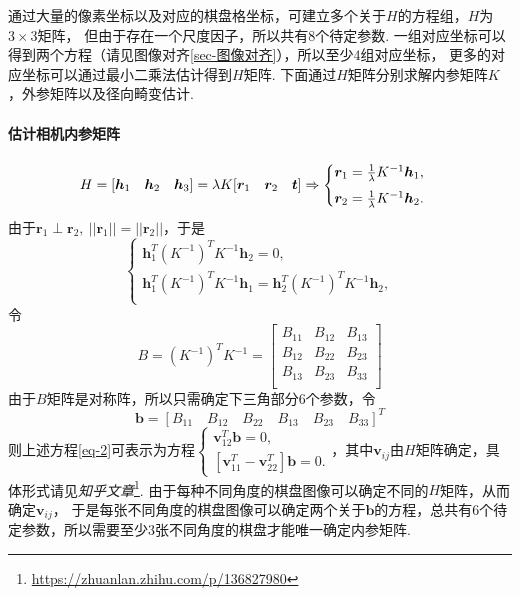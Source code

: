 \documentclass[12pt, a4paper, oneside]{ctexart}
\numberwithin{equation}{section}  %
\theoremstyle{definition}
\def\bd{\boldsymbol}        %
\def\add{\vspace{1ex}}      %
\def\del{\vspace{-1.5ex}}   %
\begin{document}
通过大量的像素坐标以及对应的棋盘格坐标，可建立多个关于$H$的方程组，$H$为$3\times 3$矩阵，
但由于存在一个尺度因子，所以共有$8$个待定参数. 一组对应坐标可以得到两个方程（请见图像对齐\ref{sec-图像对齐}），所以至少$4$组对应坐标，
更多的对应坐标可以通过最小二乘法估计得到$H$矩阵. 下面通过$H$矩阵分别求解内参矩阵$K$，外参矩阵以及径向畸变估计.

\paragraph{估计相机内参矩阵}\del
\begin{equation}
    \label{eq-1}
    H = [\bd{h}_1\quad \bd{h}_2\quad \bd{h}_3] = \lambda K[\bd{r}_1\quad \bd{r}_2\quad \bd{t}]\Rightarrow\begin{cases}
        \bd{r}_1 = \frac{1}{\lambda}K^{-1}\bd{h}_1,\add\\
        \bd{r}_2 = \frac{1}{\lambda}K^{-1}\bd{h}_2.
    \end{cases}
\end{equation}
由于$\bd{r}_1\perp \bd{r}_2,\ ||\bd{r}_1||=||\bd{r}_2||$，于是
\begin{equation}
    \label{eq-2}
    \begin{cases}
        \bd{h}_1^T(K^{-1})^TK^{-1}\bd{h}_2 = 0,\\
        \bd{h}_1^T(K^{-1})^TK^{-1}\bd{h}_1 = \bd{h}_2^T(K^{-1})^TK^{-1}\bd{h}_2,\\
    \end{cases}
\end{equation}
令
\begin{equation*}
    B = (K^{-1})^TK^{-1} = \left[\begin{matrix}
        B_{11}&B_{12}&B_{13}\\
        B_{12}&B_{22}&B_{23}\\
        B_{13}&B_{23}&B_{33}\\
    \end{matrix}\right]
\end{equation*}
由于$B$矩阵是对称阵，所以只需确定下三角部分$6$个参数，令
\begin{equation*}
    \bd{b} = [B_{11}\quad B_{12}\quad B_{22}\quad B_{13}\quad B_{23}\quad B_{33}]^T
\end{equation*}
则上述方程\ref{eq-2}可表示为方程$\begin{cases}
    \bd{v}_{12}^T\bd{b} = 0,\\
    [\bd{v}_{11}^T-\bd{v}_{22}^T]\bd{b} = 0.
\end{cases}$，其中$\bd{v}_{ij}$由$H$矩阵确定，具体形式请见\textit{知乎文章}\footnote{\url{https://zhuanlan.zhihu.com/p/136827980}}.
由于每种不同角度的棋盘图像可以确定不同的$H$矩阵，从而确定$\bd{v}_{ij}$，
于是每张不同角度的棋盘图像可以确定两个关于$\bd{b}$的方程，总共有$6$个待定参数，所以需要至少$3$张不同角度的棋盘才能唯一确定内参矩阵.
\end{document}
